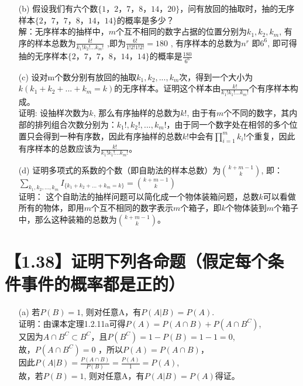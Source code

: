 \documentclass [12pt]{article}
\begin{document}
\begin{CJK*}{GBK}{kai}
\begin{enumerate}
  \item[(b)]  假设我们有六个数$\{1，2，7，8，14，20\}$，问有放回的抽取时，抽的无序样本$\{2，7，7，8，14，14\}$的概率是多少？\\
  解：无序样本的抽样中，$m$个互不相同的数字占据的位置分别为$k_1,k_2,k_m$, 有序的样本总数为$\frac{k!}{k_1! k_2! ... k_m! }$ ,即为$\frac{6!}{1! 2!  1! 2! }=180$ , 有序样本的总数为$n^r$ 即$6^6$, 即可得抽的无序样本$\{2，7，7，8，14，14\}$的概率是$\frac{180}{6^6}$ 
  \item[(c)]  设对m个数分别有放回的抽取$k_{1}, k_{2}, ... ,k_{m}$次，得到一个大小为$k(k_{1}+k_{2}+...+k_{m}=k)$的无序样本。证明这个样本由$\frac{k!}{k_{1}! k_{1}! ... k_{m}!}$个有序样本构成。\\
  证明: 设抽样次数为$k$, 那么有序抽样的总数为$k!$, 由于有$m$个不同的数字，其内部的排列组合次数分别为：$k_{1}!, k_{2}!, ... ,k_{m}!$，由于同一个数字处在相邻的多个位置只会得到一种有序数，因此有序抽样的总数$k!$中会有$\prod\limits_{i=1}^{m}{k_i!}$个重复，因此有序样本的总数应该为$\frac{k!}{k_{1}! k_{1}! ... k_{m}!}$。
  \item[(d)]  证明多项式的系数的个数（即自助法的样本总数）为${k+m-1 \choose k}$, 即：$\sum\limits_{k_1,k_2,...,k_m}{I_{\{k_{1}+k_{2}+...+k_{m}=k\}}}= {k+m-1 \choose k}$\\
 
 证明： 这个自助法的抽样问题可以简化成一个物体装箱问题，总数$k$可以看做所有的物体，即用$m$个互不相同的数字表示$m$个箱子，即$k$个物体装到$m$个箱子中，那么这种装箱的总数为${k+m-1 \choose k}$。
 
 \end{enumerate}  



\section{【1.38】证明下列各命题（假定每个条件事件的概率都是正的）}
\begin{enumerate}
  \item[(a)]  若$P(B)=1$, 则对任意A，有$P(A|B)=P(A)$.\\
  证明：由课本定理1.2.11a可得$P(A)=P(A \cap B) + P(A \cap B^{C})$,\\
  又因为$A \cap B^{C} \subset B^{C}$，且$P(B^{C})=1-P(B)=1-1=0$,\\
  故，$P(A \cap B^{C})=0$ ，所以$P(A)=P(A \cap B) $，\\
  因此$P(A|B)=\frac{P(A \cap B)}{P(B)}=\frac{P(A)}{1}=P(A)$,\\
  故，若$P(B)=1$, 则对任意A，有$P(A|B)=P(A)$得证。
  

\end{enumerate}
\end{CJK*}
\end{document}
